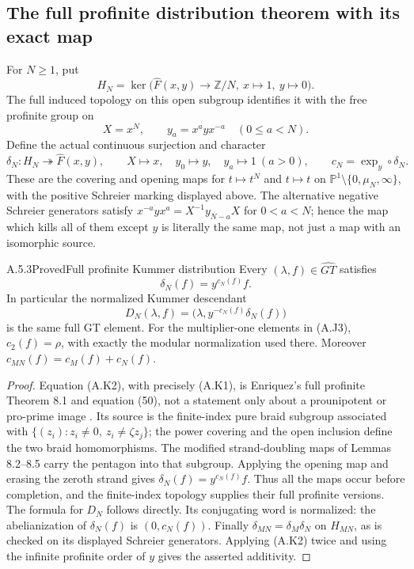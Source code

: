 \subsection{The full profinite distribution theorem with its exact map}

For $N\geq1$, put
\[
 H_N=\ker\bigl(\widehat F(x,y)\longrightarrow\mathbb Z/N,
                  \ x\mapsto1,\ y\mapsto0\bigr).
\]
The full induced topology on this open subgroup identifies it with the
free profinite group on
\[
 X=x^N,\qquad y_a=x^a yx^{-a}\quad(0\leq a<N).
\]
Define the actual continuous surjection and character
\[
 \delta_N:H_N\twoheadrightarrow\widehat F(x,y),\qquad
 X\mapsto x,\quad y_0\mapsto y,\quad y_a\mapsto1\ (a>0),
 \qquad c_N=\operatorname{exp}_y\circ\delta_N.       \tag{A.K1}
\]
These are the covering and opening maps for $t\mapsto t^N$ and
$t\mapsto t$ on $\mathbb P^1\setminus\{0,\mu_N,\infty\}$,
with the positive Schreier marking displayed above.  The alternative
negative Schreier generators satisfy
$x^{-a}yx^a=X^{-1}y_{N-a}X$ for $0<a<N$; hence the map which kills
all of them except $y$ is literally the same map, not just a map with
an isomorphic source.

\begin{result}{A.5.3}{Proved}{Full profinite Kummer distribution}
Every $(\lambda,f)\in\widehat{GT}$ satisfies
\[
                 \delta_N(f)=y^{c_N(f)}f.               \tag{A.K2}
\]
In particular the normalized Kummer descendant
\[
 D_N(\lambda,f)=\bigl(\lambda,y^{-c_N(f)}\delta_N(f)\bigr)
                                                               \tag{A.K3}
\]
is the same full GT element.  For the multiplier-one elements in
(A.J3), $c_2(f)=\rho$, with exactly the modular normalization used
there.  Moreover $c_{MN}(f)=c_M(f)+c_N(f)$.
\end{result}
\begin{proof}
Equation (A.K2), with precisely (A.K1), is Enriquez's full profinite
Theorem 8.1 and equation (50), not a statement only about a
prounipotent or pro-prime image
\cite[\S8, Theorem 8.1, pp.~30--32 of the arXiv version]{CA_Enriquez2007}.
Its source is the finite-index pure braid subgroup associated with
$\{(z_i):z_i\ne0,\ z_i\ne\zeta z_j\}$; the power covering and the
open inclusion define the two braid homomorphisms.  The modified
strand-doubling maps of Lemmas 8.2--8.5 carry the pentagon into that
subgroup.  Applying the opening map and erasing the zeroth strand
gives $\delta_N(f)=y^{c_N(f)}f$.  Thus all the maps occur before
completion, and the finite-index topology supplies their full
profinite versions.  The formula for $D_N$ follows directly.  Its
conjugating word is normalized: the abelianization of $\delta_N(f)$
is $(0,c_N(f))$.  Finally
$\delta_{MN}=\delta_M\delta_N$ on $H_{MN}$, as is checked on its
displayed Schreier generators.  Applying (A.K2) twice and using the
infinite profinite order of $y$ gives the asserted additivity.
\end{proof}

